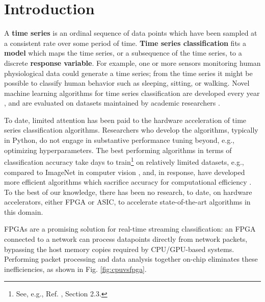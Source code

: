 \section{Introduction}
\label{sec:Introduction}

A \textbf{time series} is an ordinal sequence of data points which have been sampled at a consistent rate over some period of time. \textbf{Time series classification} fits a \textbf{model} which maps the time series, or a subsequence of the time series, to a discrete \textbf{response variable}. For example, one or more sensors monitoring human physiological data could generate a time series; from the time series it might be possible to classify human behavior such as sleeping, sitting, or walking. Novel machine learning algorithms for time series classification are developed every year \cite{BakeOff, BakeOffRedux, BakeOffReduxCorrection}, and are evaluated on datasets maintained by academic researchers \cite{UCRTimeSeries, UEATimeSeries, MONSTER}. 
 
To date, limited attention has been paid to the hardware acceleration of time series classification algorithms. Researchers who develop the algorithms, typically in Python, do not engage in substantive performance tuning beyond, e.g., optimizing hyperparameters. The best performing algorithms in terms of classification accuracy take days to train\footnote{
See, e.g., Ref. \cite{Hydra}, Section 2.3.
} on relatively limited datasets, e.g., compared to ImageNet in computer vision \cite{ImageNet}, and, in response, have developed more efficient algorithms which sacrifice accuracy for computational efficiency \cite{MiniRocket}. To the best of our knowledge, there has been no research, to date, on hardware accelerators, either FPGA or ASIC, to accelerate state-of-the-art algorithms in this domain. 

FPGAs are a promising solution for real-time streaming classification: an FPGA connected to a network can process datapoints directly from network packets, bypassing the host memory copies required by CPU/GPU-based systems. Performing packet processing and data analysis together on-chip eliminates these inefficiencies, as shown in Fig. \ref{fig:cpuvsfpga}. 



